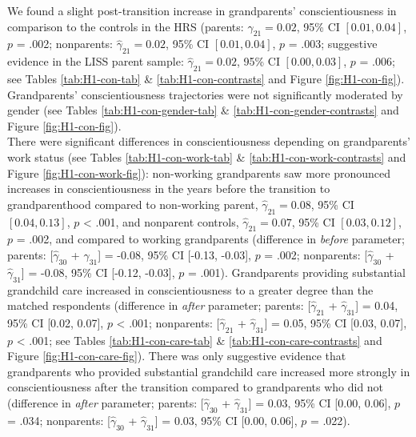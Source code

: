 \documentclass[
  english,
  man, noextraspace]{apa7}
\begin{document}
We found a slight post-transition increase in grandparents' conscientiousness in comparison to the controls in the HRS (parents: \(\hat{\gamma}_{21} = 0.02\), 95\% CI \([0.01, 0.04]\), \(p\) = .002; nonparents: \(\hat{\gamma}_{21} = 0.02\), 95\% CI \([0.01, 0.04]\), \(p\) = .003; suggestive evidence in the LISS parent sample: \(\hat{\gamma}_{21} = 0.02\), 95\% CI \([0.00, 0.03]\), \(p\) = .006; see Tables \ref{tab:H1-con-tab} \& \ref{tab:H1-con-contrasts} and Figure \ref{fig:H1-con-fig}). Grandparents' conscientiousness trajectories were not significantly moderated by gender (see Tables \ref{tab:H1-con-gender-tab} \& \ref{tab:H1-con-gender-contrasts} and Figure \ref{fig:H1-con-fig}).\\
There were significant differences in conscientiousness depending on grandparents' work status (see Tables \ref{tab:H1-con-work-tab} \& \ref{tab:H1-con-work-contrasts} and Figure \ref{fig:H1-con-work-fig}): non-working grandparents saw more pronounced increases in conscientiousness in the years before the transition to grandparenthood compared to non-working parent, \(\hat{\gamma}_{21} = 0.08\), 95\% CI \([0.04, 0.13]\), \(p\) \textless{} .001, and nonparent controls, \(\hat{\gamma}_{21} = 0.07\), 95\% CI \([0.03, 0.12]\), \(p\) = .002, and compared to working grandparents (difference in \emph{before} parameter; parents: {[}\(\hat{\gamma}_{30}\) + \(\hat{\gamma}_{31}\){]} = -0.08, 95\% CI {[}-0.13, -0.03{]}, \(p\) = .002; nonparents: {[}\(\hat{\gamma}_{30}\) + \(\hat{\gamma}_{31}\){]} = -0.08, 95\% CI {[}-0.12, -0.03{]}, \(p\) = .001). Grandparents providing substantial grandchild care increased in conscientiousness to a greater degree than the matched respondents (difference in \emph{after} parameter; parents: {[}\(\hat{\gamma}_{21}\) + \(\hat{\gamma}_{31}\){]} = 0.04, 95\% CI {[}0.02, 0.07{]}, \(p\) \textless{} .001; nonparents: {[}\(\hat{\gamma}_{21}\) + \(\hat{\gamma}_{31}\){]} = 0.05, 95\% CI {[}0.03, 0.07{]}, \(p\) \textless{} .001; see Tables \ref{tab:H1-con-care-tab} \& \ref{tab:H1-con-care-contrasts} and Figure \ref{fig:H1-con-care-fig}). There was only suggestive evidence that grandparents who provided substantial grandchild care increased more strongly in conscientiousness after the transition compared to grandparents who did not (difference in \emph{after} parameter; parents: {[}\(\hat{\gamma}_{30}\) + \(\hat{\gamma}_{31}\){]} = 0.03, 95\% CI {[}0.00, 0.06{]}, \(p\) = .034; nonparents: {[}\(\hat{\gamma}_{30}\) + \(\hat{\gamma}_{31}\){]} = 0.03, 95\% CI {[}0.00, 0.06{]}, \(p\) = .022).
\end{document}
